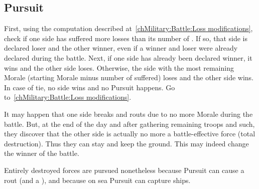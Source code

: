 \subsection{Pursuit}
\label{chMilitary:Battle:Pursuit}

\bparag First, using the computation described at~\ref{chMilitary:Battle:Loss
  modifications}, check if one side has suffered more losses than its number
of \LD. If so, that side is declared loser and the other winner, even if a
winner and loser were already declared during the battle.
\bparag Next, if one side has already been declared winner, it wins and the
other side loses.
\bparag Otherwise, the side with the most remaining Morale (starting Morale
minus number of \textetoile suffered) loses and the other side wins.
\bparag In case of tie, no side wins and no Pursuit happens. Go
to~\ref{chMilitary:Battle:Loss modifications}.

\begin{designnote}[Destruction]
  It may happen that one side breaks and routs due to no more Morale during
  the battle. But, at the end of the day and after gathering remaining troops
  and such, they discover that the other side is actually no more a
  battle-effective force (total destruction). Thus they can stay and keep the
  ground. This may indeed change the winner of the battle.

  Entirely destroyed forces are pursued nonetheless because Pursuit can cause
  a rout (and a ), and because on sea Pursuit can capture
  ships.
\end{designnote}

